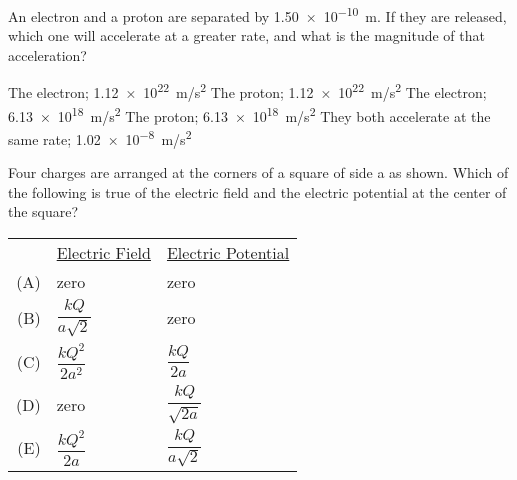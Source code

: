 \documentclass{../../../oss-classkick-exam}
\begin{document}
\begin{multicols*}{2}
\begin{questions}
    \question An electron and a proton are separated by \SI{1.50e-10}{\metre}.
    If they are released, which one will accelerate at a greater rate, and what
    is the magnitude of that acceleration?
    \begin{choices}
      \choice The electron; \SI{1.12e22}{m/s^2}
      \choice The proton; \SI{1.12e22}{m/s^2}
      \choice The electron; \SI{6.13e18}{m/s^2}
      \choice The proton; \SI{6.13e18}{m/s^2}
      \choice They both accelerate at the same rate; \SI{1.02e-8}{m/s^2}
    \end{choices}
    \vspace{.7in}
   
    \question Four charges are arranged at the corners of a square of side a as
    shown. Which of the following is true of the electric field and the electric
    potential at the center of the square?
    \begin{center}
    \end{center}
    \begin{tabular}{rll}
      & \underline{Electric Field} & \underline{Electric Potential}\\
      (A) & zero & zero \\
      (B) & $\dfrac{kQ}{a\sqrt{2}}$ & zero \\
      (C) & $\dfrac{kQ^2}{2a^2}$ &  $\dfrac{kQ}{2a}$\\
      (D) & zero &  $\dfrac{kQ}{\sqrt{2a}}$\\
      (E) & $\dfrac{kQ^2}{2a}$ & $\dfrac{kQ}{a\sqrt{2}}$
    \end{tabular}
   

\end{questions}
\end{multicols*}
\end{document}
